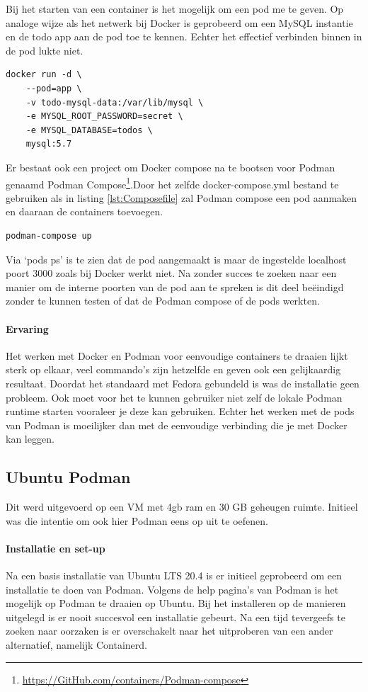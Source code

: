 Bij het starten van een container is het mogelijk om een pod me te geven. Op analoge wijze als het netwerk bij Docker is geprobeerd om een MySQL instantie en de todo app aan de pod toe te kennen. Echter het effectief verbinden binnen in de pod lukte niet.
\begin{lstlisting}
docker run -d \
    --pod=app \
    -v todo-mysql-data:/var/lib/mysql \
    -e MYSQL_ROOT_PASSWORD=secret \
    -e MYSQL_DATABASE=todos \
    mysql:5.7
\end{lstlisting}

Er bestaat ook een project om Docker compose na te bootsen voor Podman genaamd Podman Compose\footnote{\url{https://GitHub.com/containers/Podman-compose}}.Door het zelfde docker-compose.yml bestand te gebruiken als in listing \ref{lst:Composefile} zal Podman compose een pod aanmaken en daaraan de containers toevoegen. 

\begin{verbatim}
podman-compose up
\end{verbatim}
Via `pods ps' is te zien dat de pod aangemaakt is maar de ingestelde localhost poort 3000 zoals bij Docker werkt niet. Na zonder succes te zoeken naar een manier om de interne poorten van de pod aan te spreken is dit deel beëindigd zonder te kunnen testen of dat de Podman compose of de pods werkten.

\paragraph{Ervaring}
Het werken met Docker en Podman voor eenvoudige containers te draaien lijkt sterk op elkaar, veel commando’s zijn hetzelfde en geven ook een gelijkaardig resultaat. Doordat het standaard met Fedora gebundeld is was de installatie geen probleem. Ook moet voor het te kunnen gebruiker niet zelf de lokale Podman runtime starten vooraleer je deze kan gebruiken. Echter het werken met de pods van Podman is moeilijker dan met de eenvoudige verbinding die je met Docker kan leggen.

\subsection{Ubuntu Podman}
Dit werd uitgevoerd op een VM met 4gb ram en 30 GB geheugen ruimte. Initieel was die intentie om ook hier Podman eens op uit te oefenen.

\paragraph{Installatie en set-up}
Na een basis installatie van Ubuntu LTS 20.4 is er initieel geprobeerd om een installatie te doen van Podman. Volgens de help pagina’s van Podman is het mogelijk op Podman te draaien op Ubuntu. Bij het installeren op de manieren uitgelegd is er nooit succesvol een installatie gebeurt. Na een tijd tevergeefs te zoeken naar oorzaken is er overschakelt naar het uitproberen van een ander alternatief, namelijk Containerd.

